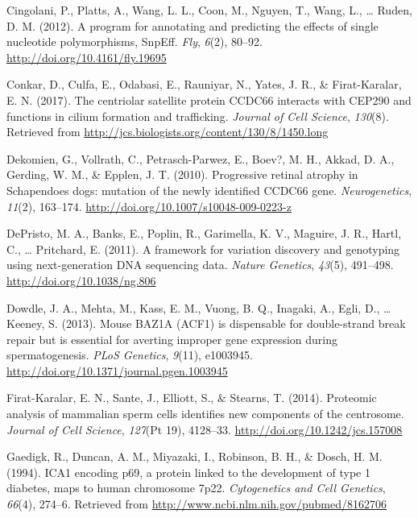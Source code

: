 \documentclass[12pt,twoside]{reedthesis}
\theoremstyle{definition}
\theoremstyle{definition}
\theoremstyle{remark}
\begin{document}
  \hypertarget{ref-Cingolani2012}{}
  Cingolani, P., Platts, A., Wang, L. L., Coon, M., Nguyen, T., Wang, L.,
  \ldots{} Ruden, D. M. (2012). A program for annotating and predicting
  the effects of single nucleotide polymorphisms, SnpEff. \emph{Fly},
  \emph{6}(2), 80--92. \url{http://doi.org/10.4161/fly.19695}
  
  \hypertarget{ref-Conkar2017}{}
  Conkar, D., Culfa, E., Odabasi, E., Rauniyar, N., Yates, J. R., \&
  Firat-Karalar, E. N. (2017). The centriolar satellite protein CCDC66
  interacts with CEP290 and functions in cilium formation and trafficking.
  \emph{Journal of Cell Science}, \emph{130}(8). Retrieved from
  \url{http://jcs.biologists.org/content/130/8/1450.long}
  
  \hypertarget{ref-Dekomien2010}{}
  Dekomien, G., Vollrath, C., Petrasch-Parwez, E., Boev?, M. H., Akkad, D.
  A., Gerding, W. M., \& Epplen, J. T. (2010). Progressive retinal atrophy
  in Schapendoes dogs: mutation of the newly identified CCDC66 gene.
  \emph{Neurogenetics}, \emph{11}(2), 163--174.
  \url{http://doi.org/10.1007/s10048-009-0223-z}
  
  \hypertarget{ref-DePristo2011}{}
  DePristo, M. A., Banks, E., Poplin, R., Garimella, K. V., Maguire, J.
  R., Hartl, C., \ldots{} Pritchard, E. (2011). A framework for variation
  discovery and genotyping using next-generation DNA sequencing data.
  \emph{Nature Genetics}, \emph{43}(5), 491--498.
  \url{http://doi.org/10.1038/ng.806}
  
  \hypertarget{ref-Dowdle2013}{}
  Dowdle, J. A., Mehta, M., Kass, E. M., Vuong, B. Q., Inagaki, A., Egli,
  D., \ldots{} Keeney, S. (2013). Mouse BAZ1A (ACF1) is dispensable for
  double-strand break repair but is essential for averting improper gene
  expression during spermatogenesis. \emph{PLoS Genetics}, \emph{9}(11),
  e1003945. \url{http://doi.org/10.1371/journal.pgen.1003945}
  
  \hypertarget{ref-Firat-Karalar2014}{}
  Firat-Karalar, E. N., Sante, J., Elliott, S., \& Stearns, T. (2014).
  Proteomic analysis of mammalian sperm cells identifies new components of
  the centrosome. \emph{Journal of Cell Science}, \emph{127}(Pt 19),
  4128--33. \url{http://doi.org/10.1242/jcs.157008}
  
  \hypertarget{ref-Gaedigk1994}{}
  Gaedigk, R., Duncan, A. M., Miyazaki, I., Robinson, B. H., \& Dosch, H.
  M. (1994). ICA1 encoding p69, a protein linked to the development of
  type 1 diabetes, maps to human chromosome 7p22. \emph{Cytogenetics and
  Cell Genetics}, \emph{66}(4), 274--6. Retrieved from
  \url{http://www.ncbi.nlm.nih.gov/pubmed/8162706}
  
\end{document}
